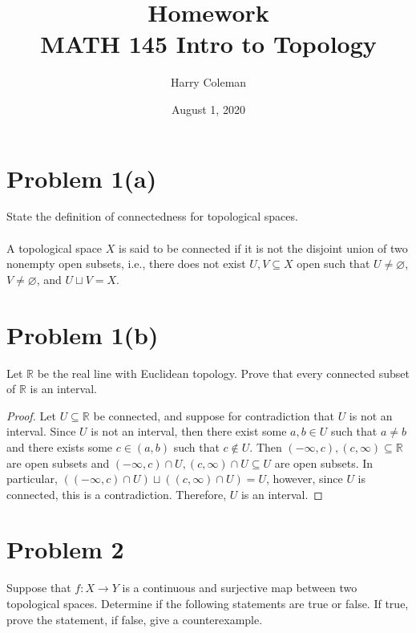 \documentclass[12pt]{article}
\newenvironment{problem}
    {\begin{lrbox}{\mybox}\begin{minipage}{\textwidth-10pt}}
    {\end{minipage}\end{lrbox}\framebox[6.5in]{\usebox{\mybox}}}
\newenvironment{response}{\paragraph{}}{}
\newcommand{\R}{\mathbb{R}}
\let\emptyset\varnothing
\begin{document}
 
\title{Homework\\
    \large MATH 145 Intro to Topology
}
\author{Harry Coleman}
\date{August 1, 2020}
\maketitle

\section*{Problem 1(a)}
\begin{problem}
    State the definition of connectedness for topological spaces.
\end{problem}

\begin{response}
    A topological space $X$ is said to be connected if it is not the disjoint union of two nonempty open subsets, i.e., there does not exist $U,V\subseteq X$ open such that $U\ne\emptyset$, $V\ne\emptyset$, and $U\sqcup V=X$.
\end{response}

\section*{Problem 1(b)}
\begin{problem}
    Let $\R$ be the real line with Euclidean topology. Prove that every connected subset of $\R$ is an interval.
\end{problem}

\begin{proof}
    Let $U\subseteq\R$ be connected, and suppose for contradiction that $U$ is not an interval. Since $U$ is not an interval, then there exist some $a,b\in U$ such that $a\ne b$ and there exists some $c\in(a,b)$ such that $c\notin U$. Then $(-\infty,c),(c,\infty)\subseteq\R$ are open subsets and $(-\infty,c)\cap U,(c,\infty)\cap U \subseteq U$ are open subsets. In particular, $((-\infty,c)\cap U) \sqcup ((c,\infty)\cap U) = U$, however, since $U$ is connected, this is a contradiction. Therefore, $U$ is an interval.
    
\end{proof}

\newpage
\section*{Problem 2}
\begin{problem}
    Suppose that $f:X\to Y$ is a continuous and surjective map between two topological spaces. Determine if the following statements are true or false. If true, prove the statement, if false, give a counterexample.
\end{problem}
\end{document}
